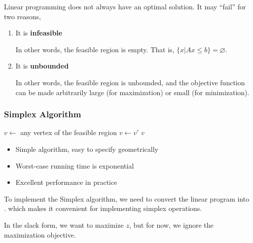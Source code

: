 \begin{remark}
    Linear programming does not always have an optimal solution. It may ``fail'' for two reasons,
    \begin{enumerate}
        \item It is \textbf{infeasible}
        
        In other words, the feasible region is empty. That is, $\{ x | Ax \le b \} = \varnothing$. 
        
        \item It is \textbf{unbounded}
        
        In other words, the feasible region is unbounded, and the objective function can be made arbitrarily large (for maximization) or small (for minimization).
    \end{enumerate}
\end{remark}

\subsubsection{Simplex Algorithm}

\begin{algorithm}[ht!]
    \begin{algorithmic}[1]
            \State $v \gets$ any vertex of the feasible region
                \State $v \gets v'$
            \EndWhile
            \State \Return $v$
        \EndFunction
    \end{algorithmic}
\end{algorithm}

\begin{itemize}
    \item Simple algorithm, easy to specify geometrically 
    \item Worst-case running time is exponential
    \item Excellent performance in practice
\end{itemize}

To implement the Simplex algorithm, we need to convert the linear program into . which makes it convenient for implementing simplex operations.

In the slack form, we want to maximize $z$, but for now, we ignore the maximization objective. 

{~~~}

